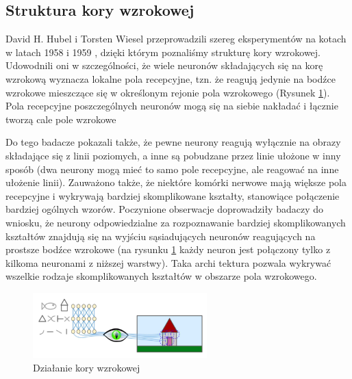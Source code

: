 \documentclass{article}
\begin{document}
\subsection{Struktura kory wzrokowej}
David H. Hubel i Torsten Wiesel przeprowadzili szereg eksperymentów na kotach w latach 1958 \cite{David_1958} i 1959 \cite{David_1959}, dzięki którym poznaliśmy strukturę kory wzrokowej. Udowodnili oni w szczególności, że wiele neuronów składających się na korę wzrokową wyznacza lokalne pola recepcyjne, tzn. że reagują jedynie na bodźce wzrokowe mieszczące się w określonym rejonie pola wzrokowego (Rysunek \ref{kora_wzrokowa}). Pola recepcyjne poszczególnych neuronów mogą się na siebie nakładać i łącznie tworzą cale pole wzrokowe \cite{geron}

Do tego badacze pokazali także, że pewne neurony reagują wyłącznie na obrazy składające się z linii poziomych, a inne są pobudzane przez linie ułożone w inny sposób (dwa neurony mogą mieć to samo pole recepcyjne, ale reagować na inne ułożenie linii). Zauważono także, że niektóre komórki nerwowe mają większe pola recepcyjne i wykrywają bardziej skomplikowane kształty, stanowiące połączenie bardziej ogólnych wzorów. Poczynione obserwacje doprowadziły badaczy do wniosku, że neurony odpowiedzialne za rozpoznawanie bardziej skomplikowanych kształtów znajdują się na wyjściu sąsiadujących neuronów reagujących na prostsze bodźce wzrokowe (na rysunku \ref{kora_wzrokowa} każdy neuron jest połączony tylko z kilkoma neuronami z niższej warstwy). Taka archi tektura pozwala wykrywać wszelkie rodzaje skomplikowanych kształtów w obszarze pola wzrokowego. \cite{geron}

\begin{figure}[H]
	\centering
	\includegraphics[width=0.6\textwidth,keepaspectratio=true]{kora_wzrokowa}
	\caption{Działanie kory wzrokowej \cite{geron}}
	\label{kora_wzrokowa}
\end{figure}

\end{document}

